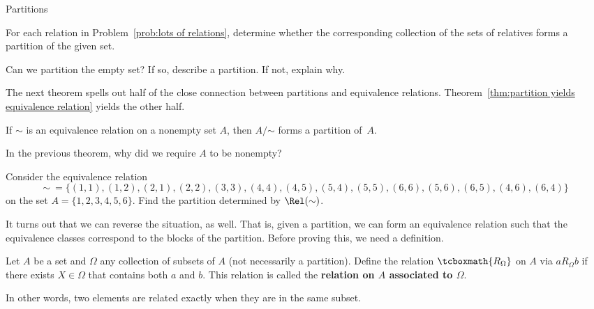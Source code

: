 \begin{section}{Partitions}
\begin{problem}
For each relation in Problem~\ref{prob:lots of relations}, determine whether the corresponding collection of the sets of relatives forms a partition of the given set.
\end{problem}

\begin{problem}
Can we partition the empty set?  If so, describe a partition.  If not, explain why.
\end{problem}

The next theorem spells out half of the close connection between partitions and equivalence relations. Theorem~\ref{thm:partition yields equivalence relation} yields the other half.

\begin{theorem}\label{thm:equiv yields partition2}
If $\sim$ is an equivalence relation on a nonempty set $A$, then $A/\mathord\sim$ forms a partition of~$A$.
\end{theorem}

\begin{problem}
In the previous theorem, why did we require $A$ to be nonempty?
\end{problem}

\begin{problem}
Consider the equivalence relation
\[
\sim\ =\{(1,1),(1,2),(2,1), (2,2),(3,3),(4,4),(4,5),(5,4),(5,5),(6,6),(5,6),(6,5),(4,6),(6,4)\}
\]
on the set $A=\{1,2,3,4,5,6\}$.  Find the partition determined by $\Rel(\sim)$.
\end{problem}

It turns out that we can reverse the situation, as well.  That is, given a partition, we can form an equivalence relation such that the equivalence classes correspond to the blocks of the partition.  Before proving this, we need a definition.

\begin{definition}
Let $A$ be a set and $\Omega$ any collection of subsets of $A$ (not necessarily a partition).  Define the relation $\tcboxmath{R_{\Omega}}$ on $A$ via $aR_{\Omega}b$ if there exists $X\in \Omega$ that contains both $a$ and $b$. This relation is called the \textbf{relation on $A$ associated to $\Omega$}.
\end{definition}

In other words, two elements are related exactly when they are in the same subset. %


\end{section}
